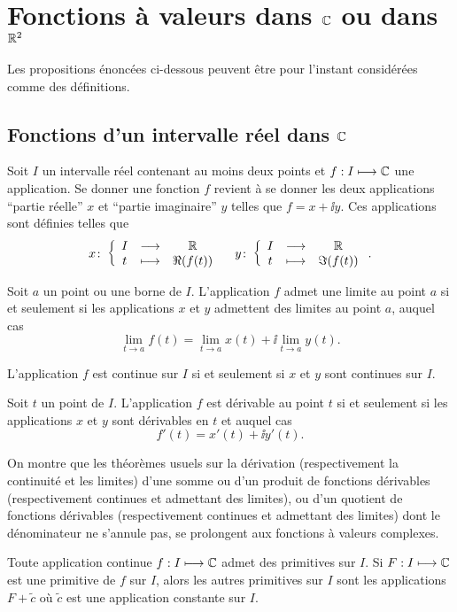 \chapter{Fonctions à valeurs dans \(\mathbb{C}\) ou dans \(\mathbb{R}^2\)}
Les propositions énoncées ci-dessous peuvent être pour l'instant considérées comme des définitions.
\section{Fonctions d'un intervalle réel dans \(\mathbb{C}\)}
Soit \(I\) un intervalle réel contenant au moins deux points et \(f : I \longmapsto \mathbb{C}\) une application. Se donner une fonction \(f\) revient à se donner les deux applications ``partie réelle'' \(x\)  et ``partie imaginaire'' \(y\) telles que \(f=x+\ii y\). Ces applications sont définies telles que
\begin{equation}
  x\colon \left\{\begin{array}{ccc} I & \longrightarrow &\mathbb{R}\\ t & \longmapsto & \Re(f(t)) \end{array} \right. \quad   y\colon \left\{\begin{array}{ccc} I & \longrightarrow &\mathbb{R}\\ t & \longmapsto & \Im(f(t)) \end{array} \right..
\end{equation}
\begin{prop}
  Soit \(a\) un point ou une borne de \(I\). L'application \(f\) admet une limite au point \(a\) si et seulement si les applications \(x\) et \(y\) admettent des limites au point \(a\), auquel cas
  \begin{equation}
    \lim\limits_{t \to a} f(t) = \lim\limits_{t \to a} x(t) +\ii \lim\limits_{t \to a} y(t).
  \end{equation}
\end{prop}
\begin{prop}
  L'application \(f\) est continue sur \(I\) si et seulement si \(x\) et \(y\) sont continues sur \(I\).
\end{prop}
\begin{prop}
  Soit \(t\) un point de \(I\). L'application \(f\) est dérivable au point \(t\) si et seulement si les applications \(x\) et \(y\) sont dérivables en \(t\) et auquel cas
  \begin{equation}
    f'(t) = x'(t) + \ii y'(t).
  \end{equation}
\end{prop}
%
On montre que les théorèmes usuels sur la dérivation (respectivement la continuité et les limites) d'une somme ou d'un produit de fonctions dérivables (respectivement continues et admettant des limites), ou d'un quotient de fonctions dérivables (respectivement continues et admettant des limites) dont le dénominateur ne s'annule pas, se prolongent aux fonctions à valeurs complexes.
%
\begin{theo}
Toute application continue \(f : I \longmapsto \mathbb{C}\) admet des primitives sur \(I\). Si \(F : I \longmapsto \mathbb{C}\) est une primitive de \(f\) sur \(I\), alors les autres primitives sur \(I\) sont les applications \(F+\tilde{c}\) où \(\tilde{c}\) est une application constante sur \(I\).
\end{theo}

